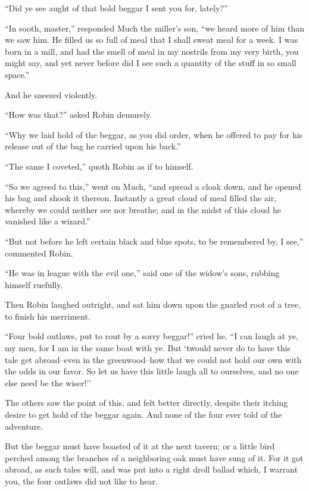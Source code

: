 ``Did ye see aught of that bold beggar I sent you for, lately?''

``In sooth, master,'' responded Much the miller's son, ``we heard more
of him than we saw him. He filled us so full of meal that I shall sweat
meal for a week. I was born in a mill, and had the smell of meal in my
nostrils from my very birth, you might say, and yet never before did I
see such a quantity of the stuff in so small space.''

And he sneezed violently.

``How was that?'' asked Robin demurely.

``Why we laid hold of the beggar, as you did order, when he offered to
pay for his release out of the bag he carried upon his back.''

``The same I coveted,'' quoth Robin as if to himself.

``So we agreed to this,'' went on Much, ``and spread a cloak down, and
he opened his bag and shook it thereon. Instantly a great cloud of meal
filled the air, whereby we could neither see nor breathe; and in the
midst of this cloud he vanished like a wizard.''

``But not before he left certain black and blue spots, to be remembered
by, I see,'' commented Robin.

``He was in league with the evil one,'' said one of the widow's sons,
rubbing himself ruefully.

Then Robin laughed outright, and sat him down upon the gnarled root of a
tree, to finish his merriment.

``Four bold outlaws, put to rout by a sorry beggar!'' cried he. ``I can
laugh at ye, my men, for I am in the same boat with ye. But `twould
never do to have this tale get abroad--even in the greenwood--how that
we could not hold our own with the odds in our favor. So let us have
this little laugh all to ourselves, and no one else need be the wiser!''

The others saw the point of this, and felt better directly, despite
their itching desire to get hold of the beggar again. And none of the
four ever told of the adventure.

But the beggar must have boasted of it at the next tavern; or a little
bird perched among the branches of a neighboring oak must have sung of
it. For it got abroad, as such tales will, and was put into a right
droll ballad which, I warrant you, the four outlaws did not like to
hear.
